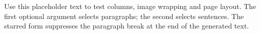 \begin{referencecode}
\usepackage{lipsum}
\end{referencecode}
\begin{referencecode}
\lipsum[1]          %
\lipsum[1-2][1]     %
\lipsum[1][1-3]     %
\lipsum*[2][1-3]    %
\end{referencecode}

\lipsum[1]          %
\lipsum[1-2][1]     %
\lipsum[1][1-3]     %
\lipsum*[2][1-3]    %
\par
Use this placeholder text to test columns, image wrapping and page layout.
The first optional argument selects paragraphs; the second selects sentences.
The starred form suppresses the paragraph break at the end of the generated text.

